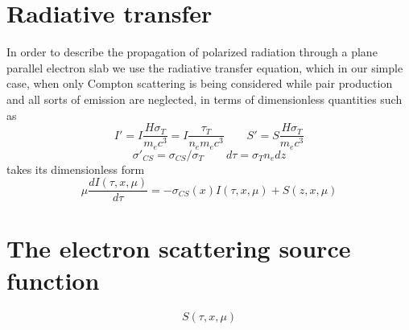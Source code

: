 \documentclass[iop, usenatbib]{emulateapj}
\newcommand{\be}{\begin{equation}}
\newcommand{\ee}{\end{equation}}
\begin{document}
\section{Radiative transfer}
In order to describe the propagation of polarized radiation through a plane parallel electron slab we use the radiative transfer equation, which in our  simple case, when only Compton scattering is being considered while pair production and all sorts of emission are neglected, in terms of dimensionless quantities such as $$
 I'=I \frac{H \sigma_T}{m_e c^3}=I \frac{\tau_T}{n_e m_e c^3} \qquad S'=S \frac{H \sigma_T}{m_e c^3}$$$$
\sigma'_{CS}=\sigma_{CS}/\sigma_T \qquad d\tau= \sigma_T n_e dz $$
takes its dimensionless form 
\be
\mu \frac{d I (\tau,x,\mu)}{d\tau} = -  \sigma_{CS}(x)I(\tau,x,\mu) + S(z,x,\mu) 
\ee




\section{The electron scattering source function}
\be
S(\tau,x,\mu)
\ee
\end{document}
